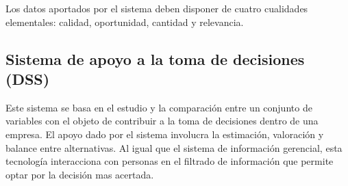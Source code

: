 Los datos aportados por el sistema deben disponer de cuatro cualidades elementales: calidad, oportunidad, cantidad y relevancia.

\setlength{\parskip}{0mm}

\subsection{Sistema de apoyo a la toma de decisiones (DSS)}
\setlength{\parskip}{5mm}

Este sistema se basa en el estudio y la comparación entre un conjunto de variables con el objeto de contribuir a la toma de decisiones dentro de una empresa. El apoyo dado por el sistema involucra la estimación, valoración y balance entre alternativas. Al igual que el sistema de información gerencial, esta tecnología interacciona con personas en el filtrado de información que permite optar por la decisión mas acertada.









